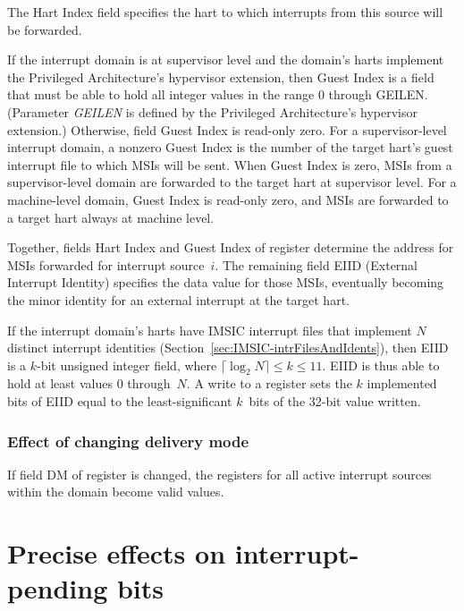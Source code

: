 The Hart Index field specifies the hart to which interrupts from this
source will be forwarded.

If the interrupt domain is at supervisor level and the domain's harts
implement the {\RISCV} Privileged Architecture's hypervisor extension,
then Guest Index is a {\WLRL} field that must be able to hold all
integer values in the range 0 through GEILEN.
(Parameter \emph{GEILEN} is defined by the Privileged Architecture's
hypervisor extension.)
Otherwise, field Guest Index is read-only zero.
For a supervisor-level interrupt domain, a nonzero Guest Index is the
number of the target hart's guest interrupt file to which MSIs will be
sent.
When Guest Index is zero, MSIs from a supervisor-level domain are
forwarded to the target hart at supervisor level.
For a machine-level domain, Guest Index is read-only zero, and MSIs are
forwarded to a target hart always at machine level.

Together, fields Hart Index and Guest Index of register 
determine the address for MSIs forwarded for interrupt source~$i$.
The remaining field EIID (External Interrupt Identity) specifies the
data value for those MSIs, eventually becoming the minor identity for
an external interrupt at the target hart.

If the interrupt domain's harts have IMSIC interrupt
files that implement $N$ distinct interrupt identities
(Section~\ref{sec:IMSIC-intrFilesAndIdents}), then
EIID is a \mbox{$k$-bit} unsigned integer field, where
$\lceil\log_{2}N\rceil \leq k \leq \mbox{11}$.
EIID is thus able to hold at least values 0 through~$N$.
A write to a  register sets the $k$ implemented bits of EIID
equal to the least-significant $k$~bits of the \mbox{32-bit} value
written.

\subsubsection*{Effect of changing delivery mode}

If field DM of register  is changed, the 
registers for all active interrupt sources within the domain become
{\unspecified} valid values.

\section{Precise effects on interrupt-pending bits}
\label{sec:AdvPLIC-pendingBits}

